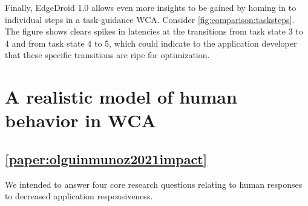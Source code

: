 Finally, EdgeDroid 1.0 allows even more insights to be gained by homing in to individual steps in a task-guidance WCA. Consider \cref{fig:comparison:tasksteps}.
The figure shows clears spikes in latencies at the transitions from task state 3 to 4 and from task state 4 to 5, which could indicate to the application developer that these specific transitions are ripe for optimization.

\section{A realistic model of human behavior in \acs{WCA}}\label{summary:model}

\subsection{\cref{paper:olguinmunoz2021impact}}\label{summary:2021impact}



We intended to answer four core research questions relating to human responses to decreased application responsiveness.

